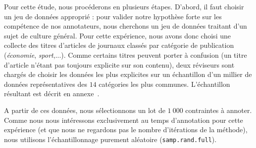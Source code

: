 			Pour cette étude, nous procéderons en plusieurs étapes.
			D'abord, il faut choisir un jeu de données approprié : pour valider notre hypothèse forte sur les compétence de nos annotateurs, nous cherchons un jeu de données traitant d'un sujet de culture général.
			Pour cette expérience, nous avons donc choisi une collecte des titres d'articles de journaux classés par catégorie de publication (\textit{économie}, \textit{sport},...).
			Comme certains titres peuvent porter à confusion (un titre d'article n'étant pas toujours explicite sur son contenu), deux réviseurs sont chargés de choisir les données les plus explicites sur un échantillon d'un millier de données représentatives des $14$ catégories les plus communes.
			L'échantillon résultant est décrit en annexe~.
			
			A partir de ces données, nous sélectionnons un lot de $1~000$ contraintes à annoter. Comme nous nous intéressons exclusivement au temps d'annotation pour cette expérience (et que nous ne regardons pas le nombre d'itérations de la méthode), nous utilisons l'échantillonnage purement aléatoire (\texttt{samp.rand.full}).			
			
